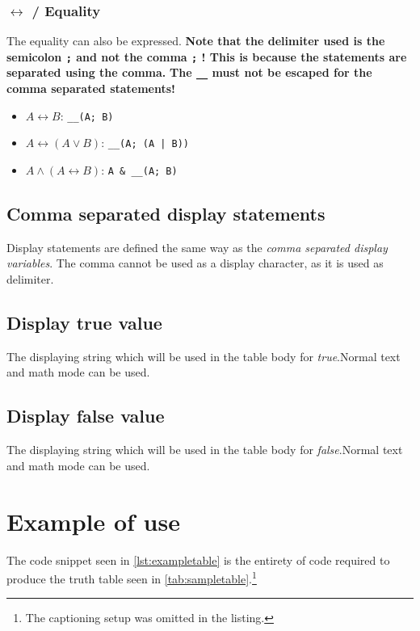 \documentclass[a4paper]{article}
\begin{document}
	\subsubsection{$\leftrightarrow$ / Equality}

	The equality can also be expressed. \textbf{Note that the delimiter used is the semicolon \texttt{;} and not the comma \texttt{;} ! This is because the statements are separated using the comma.} \textbf{The \texttt{\_\_} must not be escaped for the comma separated statements!}

	\begin{itemize}
		\item $A \leftrightarrow B$:  \texttt{\_\_(A; B)}
		\item $A \leftrightarrow (A \lor B)$: \texttt{\_\_(A; (A | B))}
		\item $A \land (A \leftrightarrow B)$: \texttt{A \& \_\_(A; B)} 
	\end{itemize}

	\subsection{Comma separated display statements}

	Display statements are defined the same way as the \emph{comma separated display variables}. The comma cannot be used as a display character, as it is used as delimiter.

	\subsection{Display true value}

	The displaying string which will be used in the table body for \emph{true}.Normal text and math mode can be used.

	\subsection{Display false value}

	The displaying string which will be used in the table body for \emph{false}.Normal text and math mode can be used.

	\newpage

	\section{Example of use}

	The code snippet seen in \autoref{lst:exampletable} is the entirety of code required to produce the truth table seen in \autoref{tab:sampletable}.\footnote{The captioning setup was omitted in the listing.}
\end{document}
